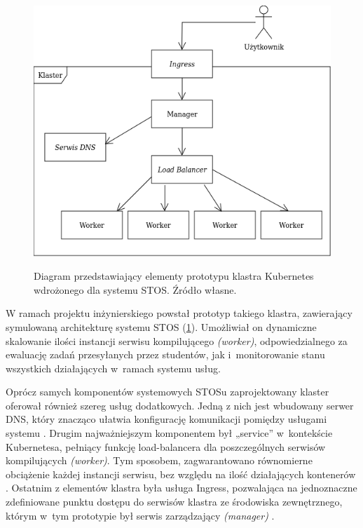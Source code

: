 \begin{figure}[!h]
	\begin{center}
		\resizebox{0.7\textwidth}{!} {
			\includegraphics{img/4/k8s.png}
		}
		\caption[Diagram prototypu klastra Kubernetes]{Diagram przedstawiający elementy prototypu klastra Kubernetes wdrożonego dla systemu STOS. Źródło własne.}
		\label{diagramk8s}
	\end{center}
\end{figure}

W ramach projektu inżynierskiego powstał prototyp takiego klastra, zawierający symulowaną architekturę systemu STOS (\ref{diagramk8s}). Umożliwiał on dynamiczne skalowanie ilości instancji serwisu kompilującego \textit{(worker)}, odpowiedzialnego za ewaluację zadań przesyłanych przez studentów, jak i~monitorowanie stanu wszystkich działających w~ramach systemu usług.

Oprócz samych komponentów systemowych STOSu zaprojektowany klaster oferował również szereg usług dodatkowych. Jedną z nich jest wbudowany serwer DNS, który znacząco ułatwia konfigurację komunikacji pomiędzy usługami systemu \cite{k8sDns}. Drugim najważniejszym komponentem był „service” w~kontekście Kubernetesa, pełniący funkcję load-balancera dla poszczególnych serwisów kompilujących \textit{(worker)}. Tym sposobem, zagwarantowano równomierne obciążenie każdej instancji serwisu, bez względu na ilość działających kontenerów \cite{k8sService}. Ostatnim z elementów klastra była usługa Ingress, pozwalająca na jednoznaczne zdefiniowane punktu dostępu do serwisów klastra ze środowiska zewnętrznego, którym w~tym prototypie był serwis zarządzający \textit{(manager)} \cite{k8sIngress}.

